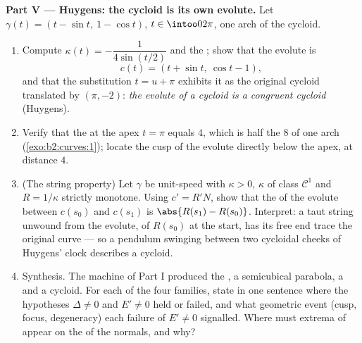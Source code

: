 \begin{problem}
\medskip
\noindent\textbf{Part V --- Huygens: the cycloid is its own
evolute.} Let $\gamma(t) = (t - \sin t,\ 1 - \cos t)$, $t \in
\intoo0{2\pi}$, one arch of the cycloid.
\begin{enumerate}[resume]
  \item Compute $\kappa(t) = -\dfrac1{4\sin(t/2)}$ and the
        ; show that the evolute is
        \[
        c(t) = (t + \sin t,\ \cos t - 1),
        \]
        and that the substitution $t = u + \pi$ exhibits it
        as the original cycloid translated by $(\pi, -2)$:
        \emph{the evolute of a cycloid is a congruent
        cycloid} (Huygens).
  \item Verify that the  at the apex $t =
        \pi$ equals $4$, which is half the  $8$ of one
        arch (\cref{exo:b2:curves:1}); locate the cusp of the
        evolute directly below the apex, at distance $4$.
  \item (The string property) Let $\gamma$ be unit-speed with
        $\kappa > 0$, $\kappa$ of class $\mathcal C^1$ and
        $R = 1/\kappa$ strictly monotone. Using $c' = R'N$,
        show that the  of the evolute between
        $c(s_0)$ and $c(s_1)$ is $\abs{R(s_1) - R(s_0)}$.
        Interpret: a taut string unwound from the evolute,
        of  $R(s_0)$ at the start, has its free end
        trace the original curve --- so a pendulum swinging
        between two cycloidal cheeks of Huygens' clock
        describes a cycloid.
  \item Synthesis. The machine of Part I produced the
        , a semicubical parabola, a  and a
        cycloid. For each of the four families, state in one
        sentence where the hypotheses $\Delta \neq 0$ and
        $E' \neq 0$ held or failed, and what geometric event
        (cusp, focus, degeneracy) each failure of $E' \neq 0$
        signalled. Where must extrema of  appear on
        the  of the normals, and why?
\end{enumerate}
\end{problem}
